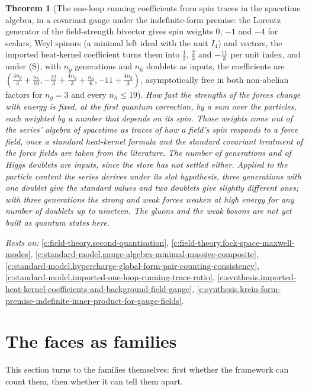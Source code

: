 \documentclass[11pt]{article}
\newtheorem{theorem}{Theorem}[section]
\theoremstyle{definition}
\theoremstyle{plain}
\begin{document}
\begin{theorem}[The one-loop running coefficients from spin traces in the spacetime algebra, in a covariant gauge under the indefinite-form premise: the Lorentz generator of the field-strength bivector gives spin weights $0$, $-1$ and $-4$ for scalars, Weyl spinors (a minimal left ideal with the unit $I_{4}$) and vectors, the imported heat-kernel coefficient turns them into $\tfrac13$, $\tfrac23$ and $-\tfrac{11}{3}$ per unit index, and under (S), with $n_{g}$ generations and $n_{h}$ doublets as inputs, the coefficients are $(\tfrac{4n_{g}}{3} + \tfrac{n_{h}}{10}, -\tfrac{22}{3} + \tfrac{4n_{g}}{3} + \tfrac{n_{h}}{6}, -11 + \tfrac{4n_{g}}{3})$, asymptotically free in both non-abelian factors for $n_{g} = 3$ and every $n_{h} \leq 19$]\label{c:synthesis.one-loop-running-coefficients-from-spacetime-algebra-spin-traces}
How fast the strengths of the forces change with energy is fixed, at the first quantum correction, by a sum over the particles, each weighted by a number that depends on its spin. Those weights come out of the series' algebra of spacetime as traces of how a field's spin responds to a force field, once a standard heat-kernel formula and the standard covariant treatment of the force fields are taken from the literature. The number of generations and of Higgs doublets are inputs, since the store has not settled either. Applied to the particle content the series derives under its slot hypothesis, three generations with one doublet give the standard values and two doublets give slightly different ones; with three generations the strong and weak forces weaken at high energy for any number of doublets up to nineteen. The gluons and the weak bosons are not yet built as quantum states here.
\end{theorem}
\noindent\emph{Rests on:} \ref{c:field-theory.second-quantisation}, \ref{c:field-theory.fock-space-maxwell-modes}, \ref{c:standard-model.gauge-algebra-minimal-massive-composite}, \ref{c:standard-model.hypercharge-global-form-pair-counting-consistency}, \ref{c:standard-model.imported-one-loop-running-trace-ratio}, \ref{c:synthesis.imported-heat-kernel-coefficients-and-background-field-gauge}, \ref{c:synthesis.krein-form-premise-indefinite-inner-product-for-gauge-fields}.

\section{The faces as families}

This section turns to the families themselves: first whether the framework can count them, then whether it can tell them apart.
\end{document}
